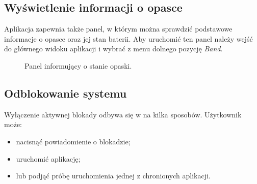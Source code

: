 \subsection{Wyświetlenie informacji o opasce}
Aplikacja zapewnia także panel, w którym można sprawdzić podstawowe informacje o opasce oraz jej stan baterii. Aby uruchomić ten panel należy wejść do głównego widoku aplikacji i wybrać z menu dolnego pozycję \textit{Band}.
\begin{figure}[H]
    \begin{center}
        \setlength{\fboxsep}{0pt}%
        \setlength{\fboxrule}{0.3pt}%
    \end{center}
    \caption{{\color{dgray}Panel informujący o stanie opaski.}} \label{BandInfo}
\end{figure}
\subsection{Odblokowanie systemu}
Wyłączenie aktywnej blokady odbywa się w na kilka sposobów. Użytkownik może:
\begin{itemize}
    \item nacisnąć powiadomienie o blokadzie;
    \item uruchomić aplikację;
    \item lub podjąć próbę uruchomienia jednej z chronionych aplikacji.
\end{itemize}

